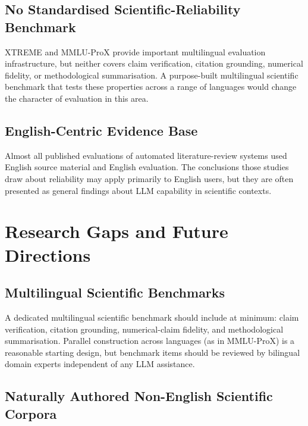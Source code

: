 \documentclass[acmsmall,screen,review]{acmart}
\begin{document}
\subsection{No Standardised Scientific-Reliability Benchmark}
\label{sec:metrics}

XTREME and MMLU-ProX provide important multilingual evaluation
infrastructure, but neither covers claim verification, citation grounding,
numerical fidelity, or methodological summarisation.  A purpose-built
multilingual scientific benchmark that tests these properties across a
range of languages would change the character of evaluation in this area.

\subsection{English-Centric Evidence Base}
\label{sec:english-bias}

Almost all published evaluations of automated literature-review systems
used English source material and English evaluation.  The conclusions those
studies draw about reliability may apply primarily to English users, but
they are often presented as general findings about LLM capability in
scientific contexts.


\section{Research Gaps and Future Directions}
\label{sec:gaps}

\subsection{Multilingual Scientific Benchmarks}
\label{sec:benchmark-gap}

A dedicated multilingual scientific benchmark should include at minimum:
claim verification, citation grounding, numerical-claim fidelity, and
methodological summarisation.  Parallel construction across languages
(as in MMLU-ProX) is a reasonable starting design, but benchmark items
should be reviewed by bilingual domain experts independent of any LLM
assistance.

\subsection{Naturally Authored Non-English Scientific Corpora}
\label{sec:corpus-gap}
\end{document}
